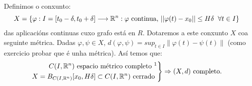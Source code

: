 \documentclass[11pt, a4paper,twoside]{article}
\makeatletter
\theoremstyle{theorem-style}  %
\renewenvironment{proof}[1][\proofname]{\par
	\pushQED{\qed}%
	\normalfont \topsep6\p@\@plus6\p@\relax
	\list{}{%
		\settowidth{\leftmargin}{\quad:\hskip\labelsep}%
		\setlength{\labelwidth}{0pt}%
		\setlength{\itemindent}{-\leftmargin}%
	}%
	\item[\hskip\labelsep\itshape#1\@addpunct{:}]\ignorespaces
}{%
	\popQED\endlist\@endpefalse
}
\theoremstyle{definition-style}
\theoremstyle{example-style}
\providecommand{\norm}[1]{\left\lVert#1\right\rVert} %
\newenvironment{rcases}
{\left.\begin{aligned}}
	{\end{aligned}\right\rbrace}
\makeatother
\begin{document}
\begin{proof}
	Definimos o conxunto:
	 \[X=\{\varphi : I=[t_0-\delta, t_0+\delta]\longrightarrow \mathbb{R}^n : \varphi \text{ continua, } ||\varphi(t)-x_0||\leq H \delta \hspace{0,2cm} \forall t \in I  \} \]
	das aplicacións continuas cuxo grafo está en $R$. Dotaremos a este conxunto $ X $ coa seguinte métrica. Dadas $\varphi, \psi \in X$, $d(\varphi, \psi) = sup_{t \in I} \norm{\varphi (t) - \psi (t)}$ (como exercicio probar que é unha métrica). Así temos que:\\
	\[\begin{rcases}
		C(I, \mathbb{R}^n) \text{ espacio métrico completo \footnotemark}\\
		X = B_{C(I, \mathbb{R}^n)} [x_0, H\delta] \subset C(I, \mathbb{R}^n) \text{ cerrado } \\
	\end{rcases} \Rightarrow (X, d) \text{ completo.}\]
	

\end{proof}
\end{document}

